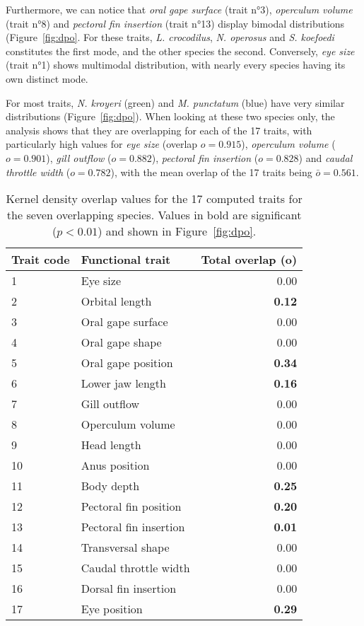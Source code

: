 Furthermore, we can notice that \emph{oral gape surface} (trait n°3), \emph{operculum volume} (trait n°8) and \emph{pectoral fin insertion} (trait n°13) display bimodal distributions (Figure~\ref{fig:dpo}. For these traits, \textit{L. crocodilus}, \textit{N. operosus} and \textit{S. koefoedi} constitutes the first mode, and the other species the second. Conversely, \emph{eye size} (trait n°1) shows multimodal distribution, with nearly every species having its own distinct mode.

For most traits, \textit{N. kroyeri} (green) and \textit{M. punctatum} (blue) have very similar distributions (Figure~\ref{fig:dpo}). When looking at these two species only, the analysis shows that they are overlapping for each of the 17 traits, with particularly high values for \emph{eye size} (overlap $o = 0.915$), \emph{operculum volume} ($o = 0.901$), \emph{gill outflow} ($o = 0.882$), \emph{pectoral fin insertion} ($o = 0.828$) and \emph{caudal throttle width} ($o = 0.782$), with the mean overlap of the 17 traits being $\bar{o} = 0.561$.


\begin{table}[!htbp]
\centering
\caption[Kernel density overlap values for the 17 traits]{Kernel density overlap values for the 17 computed traits for the seven overlapping species. Values in bold are significant ($p < 0.01$) and shown in Figure~\ref{fig:dpo}.}
\label{table:kern_over_val}
\begin{tabular}{llr}
  \toprule
Trait code & Functional trait & Total overlap (o) \\ 
  \midrule
1 & Eye size & 0.00 \\ 
  2 & Orbital length & \textbf{0.12} \\ 
  3 & Oral gape surface & 0.00 \\ 
  4 & Oral gape shape &0.00 \\ 
  5 & Oral gape position & \textbf{0.34} \\ 
  6 & Lower jaw length & \textbf{0.16} \\ 
  7 & Gill outflow & 0.00 \\ 
  8 & Operculum volume & 0.00 \\ 
  9 & Head length & 0.00 \\ 
  10 & Anus position & 0.00 \\ 
  11 & Body depth & \textbf{0.25} \\ 
  12 & Pectoral fin position & \textbf{0.20} \\ 
  13 & Pectoral fin insertion & \textbf{0.01} \\ 
  14 & Transversal shape & 0.00 \\ 
  15 & Caudal throttle width & 0.00 \\ 
  16 & Dorsal fin insertion & 0.00 \\ 
  17 & Eye position & \textbf{0.29} \\ 
   \bottomrule
\end{tabular}
\end{table} 

